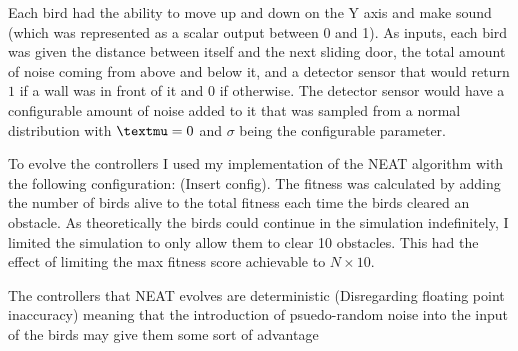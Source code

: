 Each bird had the ability to move up and down on the Y axis and make sound (which was represented as a scalar output between 0 and 1). As inputs, each bird was given the distance between itself and the next sliding door, the total amount of noise coming from above and below it, and a detector sensor that would return $1$ if a wall was in front of it and $0$ if otherwise. The detector sensor would have a configurable amount of noise added to it that was sampled from a normal distribution with $\textmu=0$ and $\sigma$ being the  configurable parameter.
\par

To evolve the controllers I used my implementation of the NEAT algorithm with the following configuration: (Insert config). The fitness was calculated by adding the number of birds alive to the total fitness each time the birds cleared an obstacle. As theoretically the birds could continue in the simulation indefinitely, I limited the simulation to only allow them to clear 10 obstacles. This had the effect of limiting the max fitness score achievable to $N\times 10$.\par

The controllers that NEAT evolves are deterministic (Disregarding floating point inaccuracy) meaning that the introduction of psuedo-random noise into the input of the birds may give them some sort of advantage 